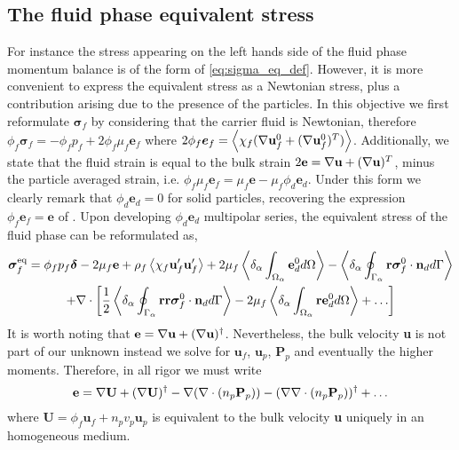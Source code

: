 
\subsection{The fluid phase equivalent stress}
For instance the stress appearing on the left hands side of the fluid phase momentum balance is of the form of \ref{eq:sigma_eq_def}. 
However, it is more convenient to express the equivalent stress as a Newtonian stress, plus a contribution arising due to the presence of the particles. 
In this objective we first reformulate $\bm{\sigma}_f$ by considering that the carrier fluid is Newtonian, therefore $\phi_f \bm{\sigma}_f = - \phi_f p_f + 2 \phi_f \mu_f \textbf{e}_f$ where $2 \phi_f \bm{e}_f = \left<\chi_f  (\mathbf{\nabla} \textbf{u}_f^0 + (\mathbf{\nabla} \textbf{u}_f^0)^T)\right>$. 
Additionally, we state that the fluid strain is equal to the bulk strain $2\textbf{e} = \mathbf{\nabla} \textbf{u}+ (\mathbf{\nabla} \textbf{u})^T$, minus the particle averaged strain, i.e. $\phi_f \mu_f \textbf{e}_f = \mu_f\textbf{e} - \mu_f \phi_d \textbf{e}_d$. 
Under this form we clearly remark that $\phi_d \textbf{e}_d = 0$ for solid particles, recovering the expression $\phi_f \textbf{e}_f = \textbf{e}$ of \citet{jackson1997locally}. 
Upon developing $\phi_d \textbf{e}_d$ multipolar series, the equivalent stress of the fluid phase can be reformulated as, 
\begin{multline}
    \bm{\sigma}^\text{eq}_f = 
    \phi_f p_f \bm\delta 
    - 2\mu_f \textbf{e} 
    + \rho_f\left<\chi_f\textbf{u}_f'\textbf{u}_f'\right> 
    + 2 \mu_f \left<\delta_\alpha \int_{\Omega_\alpha} \textbf{e}_d^0 d\Omega\right>
    - \left<\delta_\alpha \oint_{\Gamma_\alpha} \textbf{r}\bm{\sigma}_f^0\cdot \textbf{n}_d d\Gamma\right>
    \\
    + \mathbf{\nabla}\cdot \left[
        \frac{1}{2} \left<\delta_\alpha \oint_{\Gamma_\alpha} \textbf{rr}\bm{\sigma}_f^0\cdot \textbf{n}_d d\Gamma\right>
        - 2 \mu_f\left<\delta_\alpha \int_{\Omega_\alpha}  \textbf{re}_d^0  d\Omega\right>
        + \ldots
    \right]
    \label{eq:sigma_eq_0}
\end{multline} 
It is worth noting that $\textbf{e} = \mathbf{\nabla} \textbf{u} + (\mathbf{\nabla} \textbf{u})^\dagger$. 
Nevertheless, the bulk velocity \textbf{u} is not part of our unknown instead we solve for $\textbf{u}_f$, $\textbf{u}_p$, $\textbf{P}_p$ and eventually the higher moments. 
Therefore, in all rigor we must write 
\begin{equation}
    \textbf{e}
    = 
    \mathbf{\nabla} \textbf{U} + (\mathbf{\nabla} \textbf{U})^\dagger
    - \mathbf{\nabla} (\mathbf{\nabla}\cdot (n_p \textbf{P}_p))
    - (\mathbf{\nabla} \mathbf{\nabla}\cdot (n_p \textbf{P}_p))^\dagger
    + \ldots
    \label{eq:rate_of_strain}
\end{equation}
where $\textbf{U} = \phi_f \textbf{u}_f + n_p v_p \textbf{u}_p$ is equivalent to the bulk velocity \textbf{u} uniquely in an homogeneous medium. 

